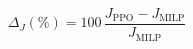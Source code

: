 \documentclass{article}
\begin{document}
\[
\Delta_J(\%)=100\,\frac{J_{\mathrm{PPO}}-J_{\mathrm{MILP}}}{J_{\mathrm{MILP}}}
\]
\end{document}
